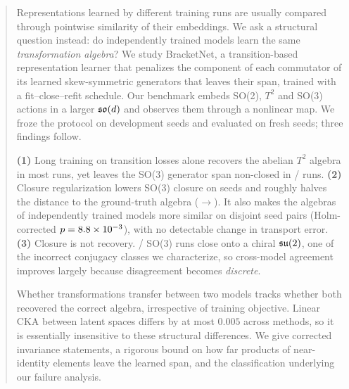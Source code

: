 \begin{abstract}
Representations learned by different training runs are usually compared through pointwise similarity of their
embeddings. We ask a structural question instead: do independently trained models learn the same
\emph{transformation algebra}? We study BracketNet, a transition-based representation learner that penalizes the
component of each commutator of its learned skew-symmetric generators that leaves their span, trained with a
fit--close--refit schedule. Our benchmark embeds SO(2), $T^2$ and SO(3) actions in a larger $\so(d)$ and
observes them through a nonlinear map. We froze the protocol on development seeds and evaluated on \NNseeds{}
fresh seeds; three findings follow.

\textbf{(1)} Long training on transition losses alone recovers the abelian $T^2$ algebra in most runs, yet leaves
the SO(3) generator span non-closed in \NSOthreeCompCatNonclosed/\NNseeds{} runs.
\textbf{(2)} Closure regularization lowers SO(3) closure on \NHoneSOthreeWins{} seeds and roughly halves the
distance to the ground-truth algebra (\NHtwoSOthreeMeanb{}$\to$\NHtwoSOthreeMeana). It also makes the algebras
of independently trained models more similar on disjoint seed pairs (Holm-corrected $p=\NHthreeSOthreeHolmp$),
with no detectable change in transport error.
\textbf{(3)} Closure is not recovery. \NSOthreeBNChiral/\NNseeds{} SO(3) runs close onto a chiral $\su(2)$, one
of the incorrect conjugacy classes we characterize, so cross-model agreement improves largely because
disagreement becomes \emph{discrete}.

Whether transformations transfer between two models tracks whether both recovered the correct algebra,
irrespective of training objective. Linear CKA between latent spaces differs by at most $0.005$ across methods, so it is essentially insensitive to these structural differences. We give corrected invariance statements, a
rigorous bound on how far products of near-identity elements leave the learned span, and the classification
underlying our failure analysis.
\end{abstract}
